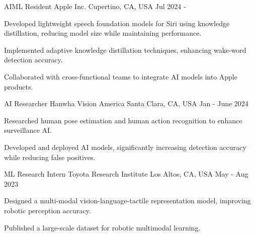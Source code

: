 


\begin{cventries}
\cventry
{AIML Resident} %
{Apple Inc.} %
{Cupertino, CA, USA} %
{Jul 2024 - } %
{ %
\begin{cvitems}
    \item Developed lightweight speech foundation models for Siri using knowledge distillation, reducing model size while maintaining performance.
    \item Implemented adaptive knowledge distillation techniques, enhancing wake-word detection accuracy.
    \item Collaborated with cross-functional teams to integrate AI models into Apple products.
\end{cvitems}
}


\cventry
{AI Researcher} %
{Hanwha Vision America} %
{Santa Clara, CA, USA} %
{Jan - June 2024} %
{ %
\begin{cvitems}
    \item Researched human pose estimation and human action recognition to enhance surveillance AI.
	\item Developed and deployed AI models, significantly increasing detection accuracy while reducing false positives.
\end{cvitems}
}


\cventry
{ML Research Intern} %
{Toyota Research Institute} %
{Los Altos, CA, USA} %
{May - Aug 2023} %
{ %
\begin{cvitems}
    \item Designed a multi-modal vision-language-tactile representation model, improving robotic perception accuracy.
    \item Published a large-scale dataset for robotic multimodal learning.
\end{cvitems}
}


\end{cventries}
